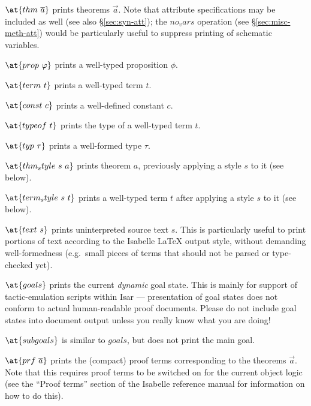 \begin{descr}

\item [$\at\{thm~\vec a\}$] prints theorems $\vec a$. Note that attribute
  specifications may be included as well (see also \S\ref{sec:syn-att}); the
  $no_vars$ operation (see \S\ref{sec:misc-meth-att}) would be particularly
  useful to suppress printing of schematic variables.

\item [$\at\{prop~\phi\}$] prints a well-typed proposition $\phi$.

\item [$\at\{term~t\}$] prints a well-typed term $t$.

\item [$\at\{const~c\}$] prints a well-defined constant $c$.

\item [$\at\{typeof~t\}$] prints the type of a well-typed term $t$.

\item [$\at\{typ~\tau\}$] prints a well-formed type $\tau$.
  
\item [$\at\{thm_style~s~a\}$] prints theorem $a$, previously applying a style
  $s$ to it (see below).
  
\item [$\at\{term_style~s~t\}$] prints a well-typed term $t$ after applying a
  style $s$ to it (see below).

\item [$\at\{text~s\}$] prints uninterpreted source text $s$.  This is
  particularly useful to print portions of text according to the Isabelle
  {\LaTeX} output style, without demanding well-formedness (e.g.\ small pieces
  of terms that should not be parsed or type-checked yet).

\item [$\at\{goals\}$] prints the current \emph{dynamic} goal state.  This is
  mainly for support of tactic-emulation scripts within Isar --- presentation
  of goal states does not conform to actual human-readable proof documents.
  Please do not include goal states into document output unless you really
  know what you are doing!
  
\item [$\at\{subgoals\}$] is similar to $goals$, but does not print the main
  goal.
  
\item [$\at\{prf~\vec a\}$] prints the (compact) proof terms corresponding to
  the theorems $\vec a$. Note that this requires proof terms to be switched on
  for the current object logic (see the ``Proof terms'' section of the
  Isabelle reference manual for information on how to do this).
  

\end{descr}
